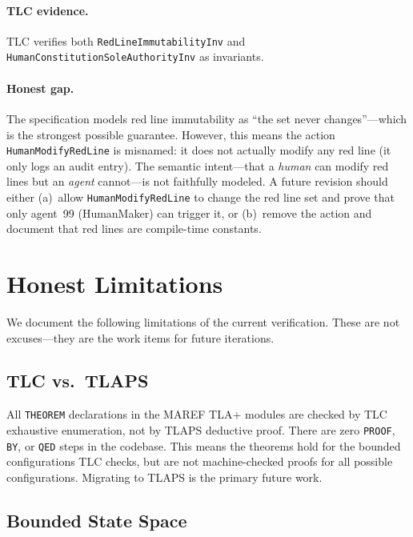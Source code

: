 \documentclass[11pt]{article}
\begin{document}
\paragraph{TLC evidence.} TLC verifies both \texttt{RedLineImmutabilityInv}
and \texttt{HumanConstitutionSoleAuthorityInv} as invariants.

\paragraph{Honest gap.} The specification models red line immutability as
``the set never changes''---which is the strongest possible guarantee.
However, this means the action \texttt{HumanModifyRedLine} is misnamed: it
does not actually modify any red line (it only logs an audit entry). The
semantic intent---that a \emph{human} can modify red lines but an
\emph{agent} cannot---is not faithfully modeled. A future revision should
either (a)~allow \texttt{HumanModifyRedLine} to change the red line set and
prove that only agent~99 (HumanMaker) can trigger it, or (b)~remove the
action and document that red lines are compile-time constants.

\section{Honest Limitations}

We document the following limitations of the current verification. These are
not excuses---they are the work items for future iterations.

\subsection{TLC vs.\ TLAPS}

All \texttt{THEOREM} declarations in the MAREF TLA+ modules are checked by TLC
exhaustive enumeration, not by TLAPS deductive proof. There are zero
\texttt{PROOF}, \texttt{BY}, or \texttt{QED} steps in the codebase. This means
the theorems hold for the bounded configurations TLC checks, but are not
machine-checked proofs for all possible configurations. Migrating to TLAPS is
the primary future work.

\subsection{Bounded State Space}
\end{document}
